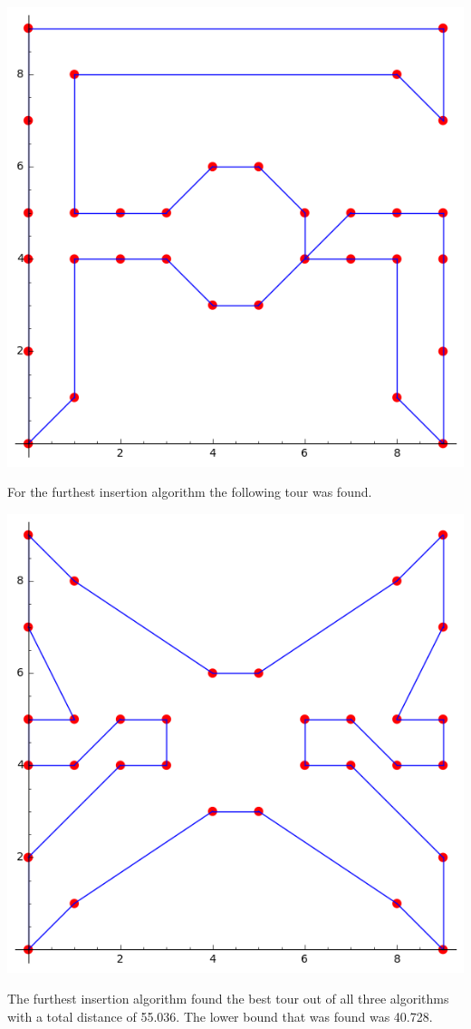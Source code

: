 \documentclass[11pt, oneside]{article}
\begin{document}
\begin{enumerate}
\begin{center}
      \includegraphics[scale=.5]{Figures/final_2.png}
    \end{center}
    For the furthest insertion algorithm the following tour was found.
    \begin{center}
      \includegraphics[scale=.5]{Figures/final_3.png}
    \end{center}
    The furthest insertion algorithm found the best tour out of all three
    algorithms with a total distance of 55.036.
    The lower bound that was found was 40.728.


\end{enumerate}
\end{document}
